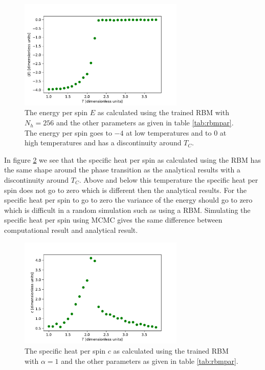 \documentclass[10 pt, a4paper]{article}
\begin{document}
\begin{figure}[H] 
\centering
\includegraphics[width=0.7\textwidth]{eRBM}
\caption{The energy per spin $E$ as calculated using the trained RBM with $N_h = 256$ and the other parameters as given in table \ref{tab:rbmpar}. The energy per spin goes to $-4$ at low temperatures and to 0 at high temperatures and has a discontinuity around $T_C$. }
\label{fig:eRBM1}
\end{figure}

In figure \ref{fig:cRBM1} we see that the specific heat per spin as calculated using the RBM has the same shape around the phase transition as the analytical results with a discontinuity around $T_C$. Above and below this temperature the specific heat per spin does not go to zero which is different then the analytical results. For the specific heat per spin to go to zero the variance of the energy should go to zero which is difficult in a random simulation such as using a RBM. Simulating the specific heat per spin using MCMC gives the same difference between computational result and analytical result.

\begin{figure}[H] 
\centering
\includegraphics[width=0.7\textwidth]{cRBM}
\caption{The specific heat per spin $c$ as calculated using the trained RBM with $\alpha = 1$ and the other parameters as given in table \ref{tab:rbmpar}.}
\label{fig:cRBM1}
\end{figure}
\end{document}
